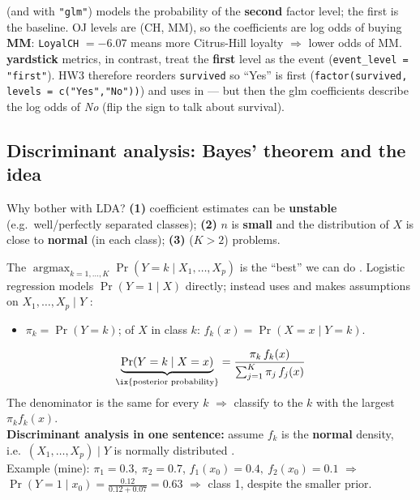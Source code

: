 \begin{trap}[Which level is ``Y = 1''? (factor levels)]
 (and  with \texttt{"glm"}) models the probability of the
\textbf{second} factor level; the first is the baseline. OJ levels are (CH, MM), so the coefficients are log odds
of buying \textbf{MM}: \texttt{LoyalCH} $=-6.07$ means more Citrus-Hill loyalty $\Rightarrow$ lower odds of MM.
\textbf{yardstick} metrics, in contrast, treat the \textbf{first} level as the event
(\texttt{event\_level = "first"}). HW3 therefore reorders \texttt{survived} so ``Yes'' is first
(\texttt{factor(survived, levels = c("Yes","No"))}) and uses  in  ---
but then the glm coefficients describe the log odds of \emph{No} (flip the sign to talk about survival).
\end{trap}

\subsection{Discriminant analysis: Bayes' theorem and the idea}

\begin{topic}{Why bother with LDA?}
\quad\textbf{(1)}  coefficient estimates can be \textbf{unstable}
(e.g.\ well/perfectly separated classes); \textbf{(2)} $n$ is \textbf{small} and the distribution of $X$ is
close to \textbf{normal} (in each class); \textbf{(3)}  ($K>2$) problems.
\end{topic}

\begin{keybox}
The  $\operatorname{argmax}_{k=1,\dots,K}\Pr(Y=k\mid X_1,\dots,X_p)$ is the ``best'' we can do
. Logistic regression models $\Pr(Y=1\mid X)$ directly;  instead uses 
and makes assumptions on $X_1,\dots,X_p\mid Y$ :
\begin{itemize}
\item {} $\pi_k=\Pr(Y=k)$;\quad
   of $X$ in class $k$: $f_k(x)=\Pr(X=x\mid Y=k)$.
\end{itemize}
\[
\underbrace{\Pr(Y=k\mid X=x)}_{\text{\ix{posterior probability}}}
=\frac{\pi_k\,f_k(x)}{\sum_{j=1}^{K}\pi_j\,f_j(x)}
\]
The denominator is the same for every $k$ $\Rightarrow$ classify to the $k$ with the largest $\pi_kf_k(x)$.\\
\textbf{Discriminant analysis in one sentence:} assume $f_k$ is the \textbf{normal} density, i.e.\
$(X_1,\dots,X_p)\mid Y$ is normally distributed .\\
{\footnotesize Example (mine): $\pi_1=0.3,\ \pi_2=0.7$, $f_1(x_0)=0.4,\ f_2(x_0)=0.1$ $\Rightarrow$
$\Pr(Y=1\mid x_0)=\frac{0.12}{0.12+0.07}=0.63$ $\Rightarrow$ class 1, despite the smaller prior.}
\end{keybox}

